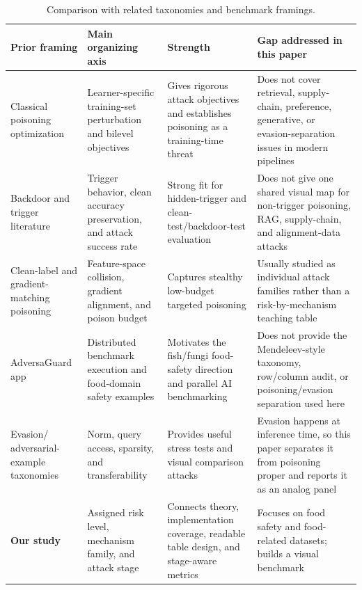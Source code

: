 \documentclass[conference]{IEEEtran}
\begin{document}
\begin{table}[t]
\centering
\caption{Comparison with related taxonomies and benchmark framings.}
\label{tab:taxcomparison}
\small
\begin{tabular}{p{}p{}p{}p{}}
\toprule
Prior framing & Main organizing axis & Strength & Gap addressed in this paper \\
\midrule
Classical poisoning optimization~\cite{biggio2012,mei2015} & Learner-specific training-set perturbation and bilevel objectives & Gives rigorous attack objectives and establishes poisoning as a training-time threat & Does not cover retrieval, supply-chain, preference, generative, or evasion-separation issues in modern pipelines \\
Backdoor and trigger literature~\cite{badnets,targetedbackdoor} & Trigger behavior, clean accuracy preservation, and attack success rate & Strong fit for hidden-trigger and clean-test/backdoor-test evaluation & Does not give one shared visual map for non-trigger poisoning, RAG, supply-chain, and alignment-data attacks \\
Clean-label and gradient-matching poisoning~\cite{poisonfrogs,witchesbrew} & Feature-space collision, gradient alignment, and poison budget & Captures stealthy low-budget targeted poisoning & Usually studied as individual attack families rather than a risk-by-mechanism teaching table \\
AdversaGuard app ~\cite{adversaguard} & Distributed benchmark execution and food-domain safety examples & Motivates the fish/fungi food-safety direction and parallel AI benchmarking & Does not provide the Mendeleev-style taxonomy, row/column audit, or poisoning/evasion separation used here \\
Evasion/ adversarial-example taxonomies~\cite{deepfool,cw,hopskipjump} & Norm, query access, sparsity, and transferability & Provides useful stress tests and visual comparison attacks & Evasion happens at inference time, so this paper separates it from poisoning proper and reports it as an analog panel \\
\textbf{Our study} & Assigned risk level, mechanism family, and attack stage & Connects theory, implementation coverage, readable table design, and stage-aware metrics & Focuses on food safety and food-related datasets; builds a visual benchmark\\
\bottomrule
\end{tabular}
\end{table}
\end{document}
